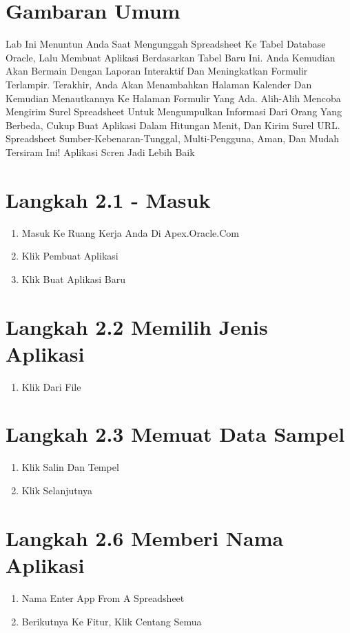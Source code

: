 \documentclass{article}
\begin{document}
\section{Gambaran Umum }
\hspace{} Lab Ini Menuntun Anda Saat Mengunggah Spreadsheet Ke Tabel Database Oracle, Lalu Membuat Aplikasi Berdasarkan Tabel Baru Ini.  Anda Kemudian Akan Bermain Dengan Laporan Interaktif Dan Meningkatkan Formulir Terlampir.  Terakhir, Anda Akan Menambahkan Halaman Kalender Dan Kemudian Menautkannya Ke Halaman Formulir Yang Ada. Alih-Alih Mencoba Mengirim Surel Spreadsheet Untuk Mengumpulkan Informasi Dari Orang Yang Berbeda, Cukup Buat Aplikasi Dalam Hitungan Menit, Dan Kirim Surel URL.  Spreadsheet Sumber-Kebenaran-Tunggal, Multi-Pengguna, Aman, Dan Mudah Tersiram Ini!  Aplikasi Scren Jadi Lebih Baik
\section{Langkah 2.1 - Masuk}
\begin{enumerate}
    \item 	Masuk Ke Ruang Kerja Anda Di Apex.Oracle.Com
\item	Klik Pembuat Aplikasi
\item	Klik Buat Aplikasi Baru

\end{enumerate}
\section{Langkah 2.2  Memilih Jenis Aplikasi}
\begin{enumerate}
    \item 	Klik Dari File
\end{enumerate}
\section{Langkah 2.3  Memuat Data Sampel}
\begin{enumerate}
    \item 	Klik Salin Dan Tempel
\item	Klik Selanjutnya

\end{enumerate}
\section{Langkah 2.6  Memberi Nama Aplikasi}
\begin{enumerate}
    \item 	Nama Enter {App From A Spreadsheet}
\item	Berikutnya Ke Fitur, Klik Centang Semua

\end{enumerate}
\end{document}
